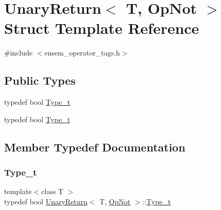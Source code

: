\hypertarget{structUnaryReturn_3_01T_00_01OpNot_01_4}{}\section{Unary\+Return$<$ T, Op\+Not $>$ Struct Template Reference}
\label{structUnaryReturn_3_01T_00_01OpNot_01_4}


{\ttfamily \#include $<$ensem\+\_\+operator\+\_\+tags.\+h$>$}

\subsection*{Public Types}
\begin{DoxyCompactItemize}
\item 
typedef bool \mbox{\hyperlink{structUnaryReturn_3_01T_00_01OpNot_01_4_a3c2ea34de12d5f13e356568135a80bd9}{Type\+\_\+t}}
\item 
typedef bool \mbox{\hyperlink{structUnaryReturn_3_01T_00_01OpNot_01_4_a3c2ea34de12d5f13e356568135a80bd9}{Type\+\_\+t}}
\end{DoxyCompactItemize}


\subsection{Member Typedef Documentation}
\mbox{\label{structUnaryReturn_3_01T_00_01OpNot_01_4_a3c2ea34de12d5f13e356568135a80bd9}} 
\subsubsection{\texorpdfstring{Type\_t}{Type\_t}\hspace{0.1cm}{\footnotesize\ttfamily [1/2]}}
{\footnotesize\ttfamily template$<$class T $>$ \\
typedef bool \mbox{\hyperlink{structUnaryReturn}{Unary\+Return}}$<$ T, \mbox{\hyperlink{structOpNot}{Op\+Not}} $>$\+::\mbox{\hyperlink{structUnaryReturn_3_01T_00_01OpNot_01_4_a3c2ea34de12d5f13e356568135a80bd9}{Type\+\_\+t}}}

\mbox{\label{structUnaryReturn_3_01T_00_01OpNot_01_4_a3c2ea34de12d5f13e356568135a80bd9}} 
